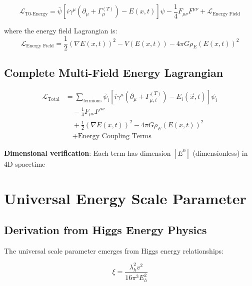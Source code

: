 \documentclass[12pt,a4paper]{article}
\newcommand{\checked}{\checkmark}
\newcommand{\Efield}{E(x,t)}
\newcommand{\vecx}{\vec{x}}
\newcommand{\xipar}{\xi}
\newcommand{\GammaT}{\Gamma_{\mu}^{(T)}}
\begin{document}
	\begin{equation}
		\boxed{\mathcal{L}_{\text{T0-Energy}} = \bar{\psi}[i\gamma^{\mu}(\partial_{\mu} + \GammaT) - \Efield]\psi - \frac{1}{4}F_{\mu\nu}F^{\mu\nu} + \mathcal{L}_{\text{Energy Field}}}
		\label{eq:energy_t0_lagrangian}
	\end{equation}
	
	where the energy field Lagrangian is:
	\begin{equation}
		\mathcal{L}_{\text{Energy Field}} = \frac{1}{2}(\nabla \Efield)^2 - V(\Efield) - 4\pi G \rho_E (\Efield)^2
		\label{eq:energy_field_lagrangian}
	\end{equation}
	
	\subsection{Complete Multi-Field Energy Lagrangian}
	\label{subsec:complete_energy_lagrangian}
	
	\begin{align}
		\mathcal{L}_{\text{Total}} &= \sum_{\text{fermions}} \bar{\psi}_i[i\gamma^{\mu}(\partial_{\mu} + \Gamma_{\mu,i}^{(T)}) - E_i(\vecx,t)]\psi_i \nonumber \\
		&\quad - \frac{1}{4}F_{\mu\nu}F^{\mu\nu} \nonumber \\
		&\quad + \frac{1}{2}(\nabla \Efield)^2 - 4\pi G \rho_E (\Efield)^2 \nonumber \\
		&\quad + \text{Energy Coupling Terms}
		\label{eq:complete_energy_lagrangian}
	\end{align}
	
	\textbf{Dimensional verification}: Each term has dimension $[E^0]$ (dimensionless) in 4D spacetime \checked
	
	\section{Universal Energy Scale Parameter}
	\label{sec:universal_scale_parameter}
	
	\subsection{Derivation from Higgs Energy Physics}
	\label{subsec:higgs_energy_derivation}
	
	The universal scale parameter emerges from Higgs energy relationships:
	
	\begin{equation}
		\boxed{\xipar = \frac{\lambda_h^2 v^2}{16\pi^3 E_h^2}}
		\label{eq:xi_energy_higgs}
	\end{equation}
	
\end{document}
